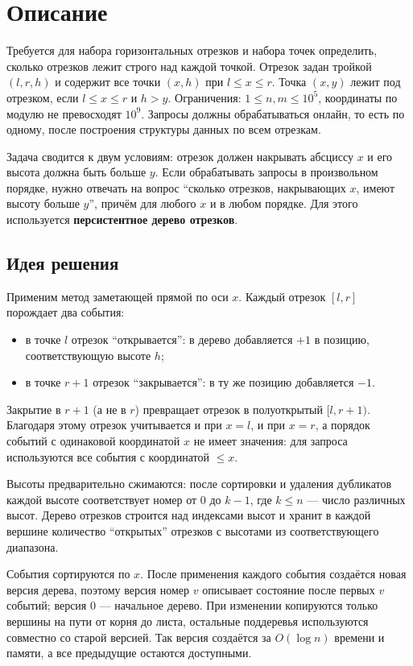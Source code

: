 \section{Описание}
Требуется для набора горизонтальных отрезков и набора точек определить, сколько отрезков лежит строго над каждой точкой.
Отрезок задан тройкой $(l, r, h)$ и содержит все точки $(x, h)$ при $l \le x \le r$. Точка $(x, y)$ лежит под отрезком,
если $l \le x \le r$ и $h > y$. Ограничения: $1 \le n, m \le 10^5$, координаты по модулю не превосходят $10^9$.
Запросы должны обрабатываться онлайн, то есть по одному, после построения структуры данных по всем отрезкам.

Задача сводится к двум условиям: отрезок должен накрывать абсциссу $x$ и его высота должна быть больше $y$.
Если обрабатывать запросы в произвольном порядке, нужно отвечать на вопрос \enquote{сколько отрезков,
накрывающих $x$, имеют высоту больше $y$}, причём для любого $x$ и в любом порядке. Для этого
используется \textbf{персистентное дерево отрезков}.

\subsection*{Идея решения}
Применим метод заметающей прямой по оси $x$. Каждый отрезок $[l, r]$ порождает два события:
\begin{itemize}
\item в точке $l$ отрезок \enquote{открывается}: в дерево добавляется $+1$ в позицию, соответствующую высоте $h$;
\item в точке $r + 1$ отрезок \enquote{закрывается}: в ту же позицию добавляется $-1$.
\end{itemize}
Закрытие в $r + 1$ (а не в $r$) превращает отрезок в полуоткрытый $[l, r + 1)$. Благодаря
этому отрезок учитывается и при $x = l$, и при $x = r$, а порядок событий с одинаковой координатой
$x$ не имеет значения: для запроса используются все события с координатой $\le x$.

Высоты предварительно сжимаются: после сортировки и удаления дубликатов каждой высоте соответствует номер
от $0$ до $k - 1$, где $k \le n$ --- число различных высот. Дерево отрезков строится над индексами
высот и хранит в каждой вершине количество \enquote{открытых} отрезков с высотами из соответствующего диапазона.

События сортируются по $x$. После применения каждого события создаётся новая версия дерева,
поэтому версия номер $v$ описывает состояние после первых $v$ событий; версия $0$ --- начальное дерево.
При изменении копируются только вершины на пути от корня до листа, остальные поддеревья используются
совместно со старой версией. Так версия создаётся за $O(\log n)$ времени и памяти, а все
предыдущие остаются доступными.

